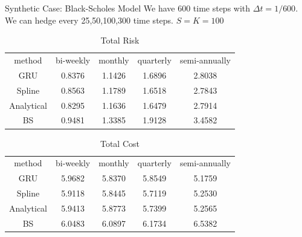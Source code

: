 \documentclass[10pt,table,mathserif]{beamer}
\begin{document}
\begin{frame}{Synthetic Case: Black-Scholes Model}
We have 600 time steps with $\Delta t=1/600$. We can hedge every 25,50,100,300 time steps. $S=K=100$
\begin{table}[htp!]
	\centering
	\begin{tabular}{|c|c|c|c|c|}
		\hline
	method       &bi-weekly &monthly&quarterly&semi-annually \\
		GRU & 0.8376& 1.1426& 1.6896 & 2.8038 \\
		Spline       & 0.8563& 1.1789& 1.6518 & 2.7843 \\
		Analytical   & 0.8295& 1.1636& 1.6479 & 2.7914 \\
		BS         & 0.9481&1.3385 & 1.9128 & 3.4582 \\
		\hline
	\end{tabular}
	\caption{Total Risk}
\end{table}
\begin{table}[htp!]
	\centering
	\begin{tabular}{|c|c|c|c|c|}
		\hline
	method       &bi-weekly &monthly&quarterly&semi-annually \\
		GRU & 5.9682& 5.8370& 5.8549 & 5.1759 \\
		Spline    & 5.9118& 5.8445& 5.7119 & 5.2530 \\
		Analytical& 5.9413& 5.8773& 5.7399 & 5.2565 \\
		BS      & 6.0483& 6.0897& 6.1734 & 6.5382 \\
		\hline
	\end{tabular}
	\caption{Total Cost}
\end{table}

\end{frame}
\end{document}

